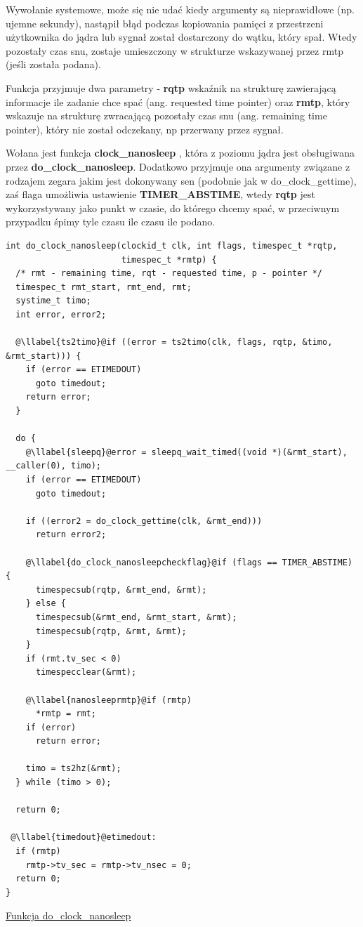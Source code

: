 \documentclass[shortabstract]{iithesis}
\makeatletter
\theoremstyle{definition} \newtheorem*{definition}{Definicja}
\theoremstyle{definition} \newtheorem*{example}{Przykład}
\theoremstyle{definition} \newtheorem*{remark}{Uwaga}
\newenvironment{longlisting}{\captionsetup{type=listing}}{}
\newcounter{llabel}[listing]%
\renewcommand*{\thellabel}{%
    \ifnum\value{llabel}<0 %
      \@ctrerr
    \else
      \ifnum\value{llabel}>10 %
        \@ctrerr
      \else
        \protect\ding{\the\numexpr\value{llabel}+201\relax}%
      \fi
    \fi
  }%
\newlength{\llabelsep}
\newcommand*{\llabel}[1]{%
  \begingroup
  \refstepcounter{llabel}%
  \label{#1}%
  \llap{\thellabel\kern\llabelsep}%
  \endgroup
}
\makeatother
\begin{document}
Wywołanie systemowe, może się nie udać kiedy argumenty są nieprawidłowe (np. ujemne sekundy), nastąpił błąd podczas kopiowania pamięci z przestrzeni użytkownika do jądra lub sygnał został dostarczony do wątku, który spał. Wtedy pozostały czas snu, zostaje umieszczony w strukturze wskazywanej przez rmtp (jeśli została podana).

Funkcja przyjmuje dwa parametry - \textbf{rqtp} wskaźnik na strukturę zawierającą informacje ile zadanie chce spać (ang. requested time pointer) oraz \textbf{rmtp}, który wskazuje na strukturę zwracającą pozostały czas snu (ang. remaining time pointer), który nie został odczekany, np przerwany przez sygnał. 

Wołana jest funkcja \textbf{clock\_nanosleep} \cite{bib:clock_nanosleep}, która z poziomu jądra jest obsługiwana przez \textbf{do\_clock\_nanosleep}. Dodatkowo przyjmuje ona argumenty związane z rodzajem zegara jakim jest dokonywany sen (podobnie jak w do\_clock\_gettime), zaś flaga umożliwia ustawienie \textbf{TIMER\_ABSTIME}, wtedy \textbf{rqtp} jest wykorzystywany jako punkt w czasie, do którego chcemy spać, w przeciwnym przypadku śpimy tyle czasu ile czasu ile podano.

\begin{longlisting}
  \begin{verbatim}
int do_clock_nanosleep(clockid_t clk, int flags, timespec_t *rqtp,
                       timespec_t *rmtp) {
  /* rmt - remaining time, rqt - requested time, p - pointer */
  timespec_t rmt_start, rmt_end, rmt;
  systime_t timo;
  int error, error2;

  @\llabel{ts2timo}@if ((error = ts2timo(clk, flags, rqtp, &timo, &rmt_start))) {
    if (error == ETIMEDOUT)
      goto timedout;
    return error;
  }

  do {
    @\llabel{sleepq}@error = sleepq_wait_timed((void *)(&rmt_start), __caller(0), timo);
    if (error == ETIMEDOUT)
      goto timedout;

    if ((error2 = do_clock_gettime(clk, &rmt_end)))
      return error2;

    @\llabel{do_clock_nanosleepcheckflag}@if (flags == TIMER_ABSTIME) {
      timespecsub(rqtp, &rmt_end, &rmt);
    } else {
      timespecsub(&rmt_end, &rmt_start, &rmt);
      timespecsub(rqtp, &rmt, &rmt);
    }
    if (rmt.tv_sec < 0)
      timespecclear(&rmt);

    @\llabel{nanosleeprmtp}@if (rmtp)
      *rmtp = rmt;
    if (error)
      return error;

    timo = ts2hz(&rmt);
  } while (timo > 0);

  return 0;

 @\llabel{timedout}@etimedout:
  if (rmtp)
    rmtp->tv_sec = rmtp->tv_nsec = 0;
  return 0;
}
  \end{verbatim}
  \caption{\href{https://mimiker.ii.uni.wroc.pl/source/xref/mimiker/sys/kern/time.c?r=9505a819\#78}{Funkcja do\_clock\_nanosleep}}
  \label{lst:funcfoclocknanosleep}
\end{longlisting}
\end{document}
